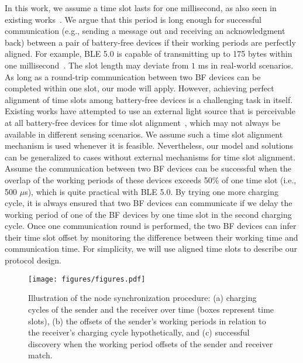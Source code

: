 \documentclass[lettersize,journal]{IEEEtran}
\begin{document}
In this work, we assume a time slot lasts for one millisecond, as also seen in existing works~\cite{2021-nsdi-find, 2022-nsdi-bonito}. We argue that this period is long enough for successful communication (e.g., sending a message out and receiving an acknowledgment back) between a pair of battery-free devices if their working periods are perfectly aligned. For example, BLE 5.0 is capable of transmitting up to 175 bytes within one millisecond~\cite{2021-specification-BLE5}. The slot length may deviate from $1$ ms in real-world scenarios. As long as a round-trip communication between two BF devices can be completed within one slot, our mode will apply.
However, achieving perfect alignment of time slots among battery-free devices is a challenging task in itself. Existing works have attempted to use an external light source that is perceivable at all battery-free devices for time slot alignment~\cite{2021-nsdi-find}, which may not always be available in different sensing scenarios. We assume such a time slot alignment mechanism is used whenever it is feasible. Nevertheless, our model and solutions can be generalized to cases without external mechanisms for time slot alignment. Assume the communication between two BF devices can be successful when the overlap of the working periods of these devices exceeds 50\% of one time slot (i.e., 500 $\mu$s), which is quite practical with BLE 5.0. By trying one more charging cycle, it is always ensured that two BF devices can communicate if we delay the working period of one of the BF devices by one time slot in the second charging cycle. Once one communication round is performed, the two BF devices can infer their time slot offset by monitoring the difference between their working time and communication time. For simplicity, we will use aligned time slots to describe our protocol design.

\begin{figure*}[t]
    \centering
    \texttt{[image: figures/figures.pdf]}
    \caption{Illustration of the node synchronization procedure: (a) charging cycles of the sender and the receiver over time (boxes represent time slots), (b) the offsets of the sender's working periods in relation to the receiver's charging cycle hypothetically, and (c) successful discovery when the working period offsets of the sender and receiver match.}
    \label{fig:sync:procedure}
\end{figure*}
\end{document}
